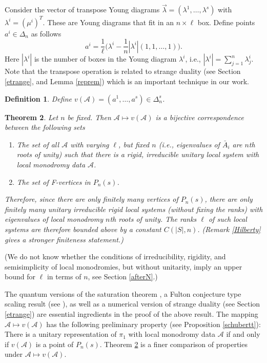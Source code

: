 \documentclass[11pt]{amsart}
\newcommand\ma{\mathcal{A}}
\newtheorem{theorem}{Theorem}[section]
\newtheorem{defi}[theorem]{Definition}
\numberwithin{theorem}{subsection}
\begin{document}
Consider the vector of transpose Young diagrams $\vec{\lambda}=(\lambda^1,\dots,\lambda^s)$ with $\lambda^i=(\mu^i)^T$. These are Young diagrams that fit in an $n\times\ell$ box.  Define points
${a}^i\in\Delta_{n}$ as follows
$$a^i=\frac{1}{\ell}\bigl(\lambda^i -\frac{1}{n}|\lambda^i|(1,1,\dots,1)\bigr).$$
Here $|\lambda^i|$ is the number of boxes in the Young diagram $\lambda^i$, i.e., $|\lambda^i|=\sum_{j=1}^n \lambda^i_j$. Note that the transpose operation is related to strange duality (see Section \ref{etrange}, and Lemma \ref{reprem}) which is an important technique in our work.
\begin{defi}\label{finiteness}
Define $v(\mathcal{A})=(a^1,\dots,a^s)\in \Delta_{n}^s$.
\end{defi}
\begin{theorem}\label{egregium}
Let $n$ be fixed. Then $\mathcal{A}\mapsto v(\mathcal{A})$  is a bijective correspondence between the following sets
\begin{enumerate}
\item The set of all $\ma$ with varying $\ell$, but fixed $n$ (i.e., eigenvalues of $\bar{A}_i$ are $n$th roots of unity) such that there is a rigid, irreducible unitary local system with local monodromy data $\mathcal{A}$.
\item The set  of F-vertices in $P_n(s)$.
\end{enumerate}
Therefore, since there are only finitely many vertices of $P_n(s)$, there are only finitely many unitary irreducible rigid local systems (without fixing the ranks) with eigenvalues of local monodromy $n$th roots of unity. The ranks $\ell$ of such local systems are therefore bounded above by a constant $C(|S|,n)$.
(Remark \ref{Hilberty} gives a stronger finiteness statement.)
\end{theorem}
(We do not know whether the conditions of irreducibility, rigidity, and semisimplicity of local monodromies, but without unitarity, imply an upper bound for $\ell$ in terms of $n$, see Section \ref{afterN}.)

The quantum versions of the saturation theorem \cite{BHorn}, a Fulton conjecture  type scaling result (see \cite[Remark 8.5]{BKq}), as well as  a numerical version of strange duality (see Section \ref{etrange}) are essential ingredients in the proof of the above result.  The mapping $\mathcal{A}\mapsto v(\mathcal{A})$ has the following preliminary  property (see Proposition \ref{schubertt}): There is a unitary representation of $\pi_1$ with  local monodromy data $\mathcal{A}$ if and only if
 $v(\ma)$ is a point of $P_n(s)$. Theorem \ref{egregium} is a finer comparison of properties under $\mathcal{A}\mapsto v(\mathcal{A})$.
\end{document}
